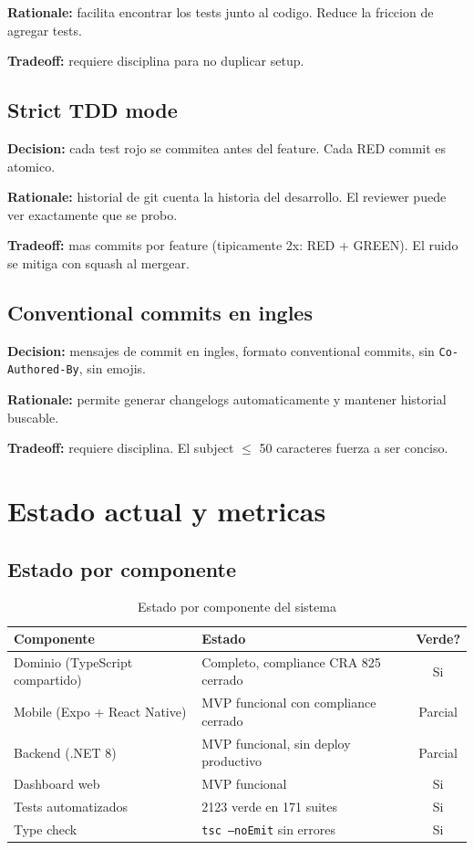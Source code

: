 \documentclass[11pt,a4paper,oneside]{report}
\begin{document}
\textbf{Rationale:} facilita encontrar los tests junto al codigo. Reduce la friccion de agregar tests.

\textbf{Tradeoff:} requiere disciplina para no duplicar setup.

\section{Strict TDD mode}

\textbf{Decision:} cada test rojo se commitea antes del feature. Cada RED commit es atomico.

\textbf{Rationale:} historial de git cuenta la historia del desarrollo. El reviewer puede ver exactamente que se probo.

\textbf{Tradeoff:} mas commits por feature (tipicamente 2x: RED + GREEN). El ruido se mitiga con squash al mergear.

\section{Conventional commits en ingles}

\textbf{Decision:} mensajes de commit en ingles, formato conventional commits, sin \texttt{Co-Authored-By}, sin emojis.

\textbf{Rationale:} permite generar changelogs automaticamente y mantener historial buscable.

\textbf{Tradeoff:} requiere disciplina. El subject $\leq$ 50 caracteres fuerza a ser conciso.


\chapter{Estado actual y metricas}

\section{Estado por componente}

\begin{table}[h]
\centering
\caption{Estado por componente del sistema}
\begin{tabularx}{\textwidth}{L{5cm} X c}
\toprule
\textbf{Componente} & \textbf{Estado} & \textbf{Verde?} \\
\midrule
Dominio (TypeScript compartido) & Completo, compliance CRA 825 cerrado & Si \\
Mobile (Expo + React Native) & MVP funcional con compliance cerrado & Parcial \\
Backend (.NET 8) & MVP funcional, sin deploy productivo & Parcial \\
Dashboard web & MVP funcional & Si \\
Tests automatizados & 2123 verde en 171 suites & Si \\
Type check & \texttt{tsc --noEmit} sin errores & Si \\
\bottomrule
\end{tabularx}
\end{table}
\end{document}
